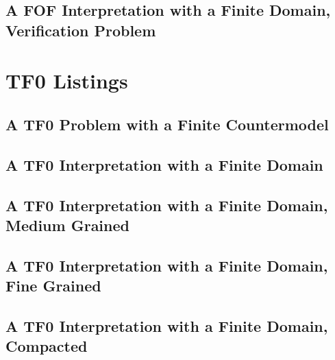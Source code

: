 \documentclass{easychair}
\begin{document}
\newpage
\subsection{A FOF Interpretation with a Finite Domain, Verification Problem}
\label{FOF_Finite.s.p}
\begin{small}

\end{small}

\newpage
\section{TF0 Listings}
\label{TF0Listings}

\subsection{A TF0 Problem with a Finite Countermodel}
\label{TFF_Finite.p}
\begin{small}

\end{small}

\newpage
\subsection{A TF0 Interpretation with a Finite Domain}
\label{TFF_Finite.s}
\begin{small}

\end{small}

\newpage
\subsection{A TF0 Interpretation with a Finite Domain, Medium Grained}
\label{TFF_Finite_Medium.s}
\begin{small}

\end{small}

\newpage
\subsection{A TF0 Interpretation with a Finite Domain, Fine Grained}
\label{TFF_Finite_Fine.s}
\begin{small}

\end{small}

\newpage
\subsection{A TF0 Interpretation with a Finite Domain, Compacted}
\label{TFF_Finite_Compact.s}
\begin{small}

\end{small}
\end{document}
